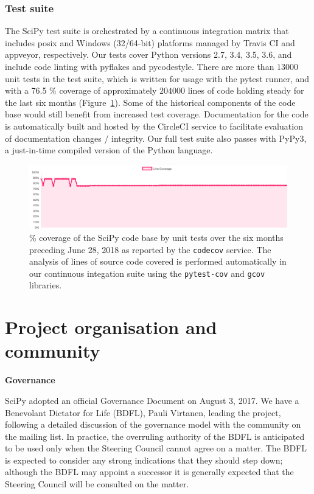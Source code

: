 \documentclass[fleqn,10pt]{wlscirep}
\begin{document}
    \subsubsection*{Test suite}
    The SciPy test suite is orchestrated by a continuous integration matrix
    that includes posix and Windows (32/64-bit) platforms managed by Travis CI and appveyor,
    respectively. Our tests cover Python versions 2.7, 3.4, 3.5, 3.6, and include
    code linting with pyflakes and pycodestyle. There are more than $13000$ unit
    tests in the test suite, which is written for usage with the pytest runner, and
    with a 76.5 \% coverage of approximately $204000$ lines
    of code holding steady for the last six months (Figure~\ref{fig:coverage}).
    Some of the historical components of the code base would still benefit from
    increased test coverage. Documentation for the code is automatically built and hosted 
    by the CircleCI service to facilitate evaluation of documentation changes / integrity.
    Our full test suite also passes with PyPy3, a just-in-time compiled version
    of the Python language.

\begin{figure}[H]
\centering
\includegraphics[width=\textwidth]{static/coverage-chart}
\caption{\% coverage of the SciPy code base by unit tests over the six
	 months preceding June 28, 2018 as reported by the \texttt{codecov}
	 service. The analysis of lines of source code covered is performed
	 automatically in our continuous integation suite using the
	 \texttt{pytest-cov} and \texttt{gcov} libraries.}
\label{fig:coverage}
\end{figure}
    




\section*{Project organisation and community}

\textbf{Governance}

SciPy adopted an official Governance Document on August 3,
2017\cite{SciPyProjectGovernance}.
We have a Benevolant Dictator for Life (BDFL), Pauli Virtanen, leading the
project, following a detailed discussion of the governance model with the
community on the mailing list.  In practice, the overruling authority of the BDFL
is anticipated to be used only when the Steering Council cannot agree on a matter.
The BDFL is expected to consider any strong indications that they should step down;
although the BDFL may appoint a successor it is generally expected that the Steering
Council will be consulted on the matter.
\end{document}

